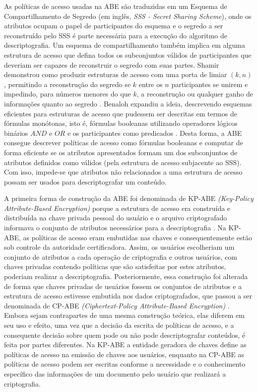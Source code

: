 \documentclass[a4paper,11pt]{article}
\begin{document}

As políticas de acesso usadas na ABE são traduzidas em um Esquema de Compartilhamento de Segredo (em inglês, \emph{SSS - Secret Sharing Scheme}), onde os atributos ocupam o papel de participantes do esquema e o segredo a ser reconstruído pelo SSS é parte necessária para a execução do algoritmo de descriptografia.
Um esquema de compartilhamento também implica em alguma estrutura de acesso que defina todos os subconjuntos válidos de participantes que deveriam ser capazes de reconstruir o segredo com suas partes.
Shamir demonstrou como produzir estruturas de acesso com uma porta de limiar $(k,n)$, permitindo a reconstrução do segredo se $k$ entre os $n$ participantes se unirem e impedindo, para números menores do que $k$, a reconstrução ou qualquer ganho de informações quanto ao segredo \cite{Shamir1979}.
Benaloh expandiu a ideia, descrevendo esquemas eficientes para estruturas de acesso que pudessem ser descritas em termos de fórmulas monótonas, isto é, fórmulas booleanas utilizando operadores lógicos binários $AND$ e $OR$ e os participantes como predicados \cite{Benaloh1988}.
Desta forma, a ABE consegue descrever políticas de acesso como fórmulas booleanas e computar de forma eficiente se os atributos apresentados formam um dos subconjuntos de atributos definidos como válidos (pela estrutura de acesso subjacente ao SSS). Com isso, impede-se que atributos não relacionados a uma estrutura de acesso possam ser usados para descriptografar um conteúdo.

A primeira forma de construção da ABE foi denominada de KP-ABE \emph{(Key-Policy Attribute-Based Encryption)} porque a estrutura de acesso era construída e distribuída na chave privada pessoal do usuário e o arquivo criptografado informava o conjunto de atributos necessários para a descriptografia \cite{Goyal2006}.
Na KP-ABE, as políticas de acesso eram embutidas nas chaves e consequentemente estão sob controle da autoridade certificadora.
Assim, os usuários escolheriam um conjunto de atributos a cada operação de criptografia e outros usuários, com chaves privadas contendo políticas que são satisfeitas por estes atributos, poderiam realizar a descriptografia.
Posteriormente, essa construção foi alterada de forma que chaves privadas de usuários fossem os conjuntos de atributos e a estrutura de acesso estivesse embutida nos dados criptografados, que passou a ser denominada de CP-ABE \emph{(Ciphertext-Policy Attribute-Based Encryption)} \cite{Bethencourt2007}.
Embora sejam contrapartes de uma mesma construção teórica, elas diferem em seu uso e efeito, uma vez que a decisão da escrita de políticas de acesso, e a consequente decisão sobre quem pode ou não pode descriptografar conteúdos, é feita por partes diferentes.
Na KP-ABE a entidade geradora de chaves define as políticas de acesso na emissão de chaves aos usuários, enquanto na CP-ABE as políticas de acesso podem ser escritas conforme a necessidade e o conhecimento específico das informações de um documento pelo usuário que realizará a criptografia.
\end{document}
